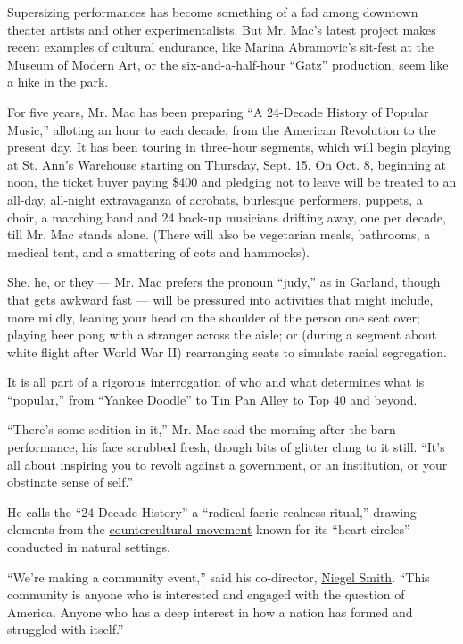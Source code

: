 Supersizing performances has become something of a fad among downtown
theater artists and other experimentalists. But Mr. Mac's latest project
makes recent examples of cultural endurance, like Marina Abramovic's
sit-fest at the Museum of Modern Art, or the six-and-a-half-hour
``Gatz'' production, seem like a hike in the park.

For five years, Mr. Mac has been preparing ``A 24-Decade History of
Popular Music,'' alloting an hour to each decade, from the American
Revolution to the present day. It has been touring in three-hour
segments, which will begin playing at
\href{http://stannswarehouse.org/show/taylor-mac-24-decade-history-popular-music-1776-2016/}{St.
Ann's Warehouse} starting on Thursday, Sept. 15. On Oct. 8, beginning at
noon, the ticket buyer paying \$400 and pledging not to leave will be
treated to an all-day, all-night extravaganza of acrobats, burlesque
performers, puppets, a choir, a marching band and 24 back-up musicians
drifting away, one per decade, till Mr. Mac stands alone. (There will
also be vegetarian meals, bathrooms, a medical tent, and a smattering of
cots and hammocks).

She, he, or they --- Mr. Mac prefers the pronoun ``judy,'' as in
Garland, though that gets awkward fast --- will be pressured into
activities that might include, more mildly, leaning your head on the
shoulder of the person one seat over; playing beer pong with a stranger
across the aisle; or (during a segment about white flight after World
War II) rearranging seats to simulate racial segregation.

It is all part of a rigorous interrogation of who and what determines
what is ``popular,'' from ``Yankee Doodle'' to Tin Pan Alley to Top 40
and beyond.

``There's some sedition in it,'' Mr. Mac said the morning after the barn
performance, his face scrubbed fresh, though bits of glitter clung to it
still. ``It's all about inspiring you to revolt against a government, or
an institution, or your obstinate sense of self.''

He calls the ``24-Decade History'' a ``radical faerie realness ritual,''
drawing elements from the \href{http://www.radfae.org/}{countercultural
movement} known for its ``heart circles'' conducted in natural settings.

``We're making a community event,'' said his co-director,
\href{http://www.nytimes3xbfgragh.onion/2015/09/19/theater/the-fleas-new-artistic-director-is-dreaming-big.html}{Niegel
Smith}. ``This community is anyone who is interested and engaged with
the question of America. Anyone who has a deep interest in how a nation
has formed and struggled with itself.''

